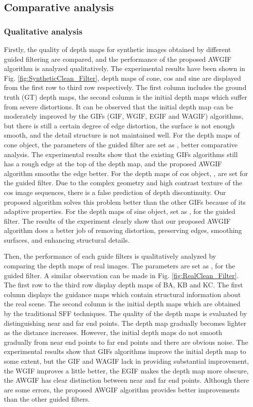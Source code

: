 \documentclass[a4paper,fleqn]{cas-dc}
\begin{document}
\subsection{Comparative analysis}\label{Comparative}
\subsubsection{Qualitative analysis}\label{Qualitative}
Firstly, the quality of depth maps for synthetic images obtained by different guided filtering are compared, and the performance of the proposed AWGIF algorithm is analyzed qualitatively. The experimental results have been shown in Fig. \ref{fig:SyntheticClean_Filter}, depth maps of cone, cos and sine are displayed from the first row to third row respectively. The first column includes the ground truth (GT) depth maps, the second column is the initial depth maps which suffer from severe distortions. It can be observed that the initial depth map can be moderately improved by the GIFs (GIF, WGIF, EGIF and WAGIF) algorithms, but there is still a certain degree of edge distortion, the surface is not enough smooth, and the detail structure is not maintained well. For the depth maps of cone object, the parameters of the guided filter are set as ,  better comparative analysis. The experimental results show that the existing GIFs algorithms still has a rough edge at the top of the depth map, and the proposed AWGIF algorithm smooths the edge better. For the depth maps of cos object, ,  are set for the guided filter. Due to the complex geometry and high contrast texture of the cos image sequences, there is a false prediction of depth discontinuity. Our proposed algorithm solves this problem better than the other GIFs because of its adaptive properties. For the depth maps of sine object, set as ,  for the guided filter. The results of the experiment clearly show that our proposed AWGIF algorithm does a better job of removing distortion, preserving edges, smoothing surfaces, and enhancing structural details.

Then, the performance of each guide filters is qualitatively analyzed by comparing the depth maps of real images. The parameters are set as ,  for the guided filter. A similar observation can be made in Fig. \ref{fig:RealClean_Filter}. The first row to the third row display depth maps of BA, KB and KC. The first column displays the guidance maps which contain structural information about the real scene. The second column is the initial depth maps which are obtained by the traditional SFF techniques. The quality of the depth maps is evaluated by distinguishing near and far end points. The depth map gradually becomes lighter as the distance increases. However, the initial depth maps do not smooth gradually from near end points to far end points and there are obvious noise. The experimental results show that GIFs algorithms improve the initial depth map to some extent, but the GIF and WAGIF lack in providing substantial improvement, the WGIF improves a little better, the EGIF makes the depth map more obscure, the AWGIF has clear distinction between near and far end points. Although there are some errors, the proposed AWGIF algorithm provides better improvements than the other guided filters.
\end{document}
